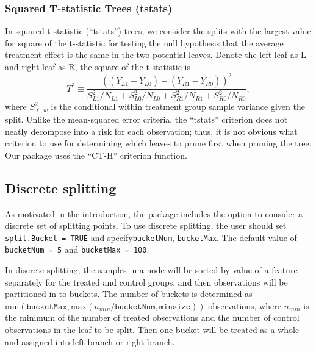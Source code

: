 \documentclass[11pt]{article}
\newcommand{\oy}{\overline{Y}}
\begin{document}
\subsubsection{Squared T-statistic Trees (\textbf{tstats})}
In squared t-statistic (``tstats'') trees, we consider the splits with the largest value for square of the t-statistic for testing the null hypothesis that the average treatment effect is the same in the two potential leaves. Denote the left leaf as L and right leaf as R, the square of the t-statistic is
\[ T^2 \equiv \frac{((\oy_{L1}-\oy_{L0})-
(\oy_{R1}-\oy_{R0})
)^2}{S_{L1}^2/N_{L1}+ S_{L0}^2/N_{L0}+S_{R1}^2/N_{R1}+S_{R0}^2/N_{R0}},\]
where $S_{\ell,w}^2$ is the conditional within treatment group sample variance given the split.  Unlike the mean-squared error criteria, the ``tstats'' criterion does not neatly
decompose into a risk for each observation; thus, it is not obvious what criterion to use for determining which leaves to prune first when pruning the tree.  Our package uses
the ``CT-H'' criterion function.
\subsection{Discrete splitting}
As motivated in the introduction, the package includes the option to consider a discrete set of splitting points. To use discrete splitting, the user should set \texttt{split.Bucket = TRUE} and specify\texttt{bucketNum}, \texttt{bucketMax}. The default value of \texttt{bucketNum = 5} and \texttt{bucketMax = 100}.\par
In discrete splitting, the samples in a node will be sorted by value of a feature separately for the treated and control groups, and then observations will be partitioned in to buckets. The number of buckets is determined as $\text{min}(\texttt{bucketMax},\text{max}(n_{min}/\texttt{bucketNum},\texttt{minsize}))$ observations, where $n_{min}$ is the minimum of the
number of treated observations and the number of control observations in the leaf to be split. Then one bucket will be treated as a whole and assigned into left branch or right branch.
\end{document}
